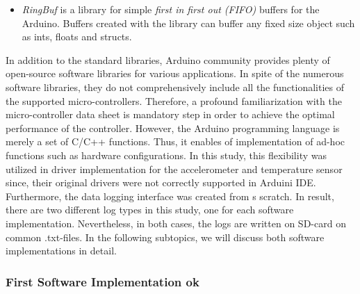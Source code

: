 \documentclass[english,12pt,a4paper,pdftex,elec,utf8]{aaltothesis}
\begin{document}
\begin{itemize}
\item \textit{RingBuf} is a library for simple \textit{first in first out (FIFO)} buffers for the Arduino. Buffers created with the library can buffer any fixed size object such as ints, floats and structs. \cite{arduinoringbuf}
\end{itemize} In addition to the standard libraries, Arduino community provides plenty of open-source software libraries for various applications. In spite of the numerous software libraries, they do not comprehensively include all the functionalities of the supported micro-controllers. Therefore, a profound familiarization with the micro-controller data sheet is mandatory step in order to achieve the optimal performance of the controller. However, the Arduino programming language is merely a set of C/C++ functions. Thus, it enables of implementation of ad-hoc functions such as hardware configurations. In this study, this flexibility was utilized in driver implementation for the accelerometer and temperature sensor since, their original drivers were not correctly supported in Arduini IDE. Furthermore, the data logging interface was created from s scratch. In result, there are two different log types in this study, one for each software implementation. Nevertheless, in both cases, the logs are written on SD-card on common .txt-files. In the following subtopics, we will discuss both software implementations in detail.



\subsubsection*{First Software Implementation ok}\label{firstdatasetconfigurations}



\end{document}
